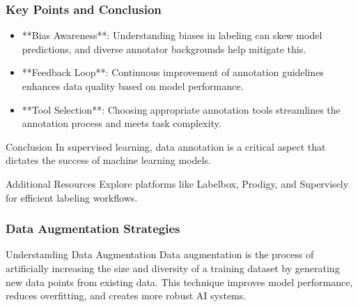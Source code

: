\documentclass[aspectratio=169]{beamer}
\begin{document}
\begin{frame}[fragile]
    \frametitle{Key Points and Conclusion}
    \begin{itemize}
        \item **Bias Awareness**: Understanding biases in labeling can skew model predictions, and diverse annotator backgrounds help mitigate this.
        \item **Feedback Loop**: Continuous improvement of annotation guidelines enhances data quality based on model performance.
        \item **Tool Selection**: Choosing appropriate annotation tools streamlines the annotation process and meets task complexity.
    \end{itemize}
    \begin{block}{Conclusion}
        In supervised learning, data annotation is a critical aspect that dictates the success of machine learning models. 
    \end{block}
    \begin{block}{Additional Resources}
        Explore platforms like Labelbox, Prodigy, and Supervisely for efficient labeling workflows.
    \end{block}
\end{frame}

\begin{frame}[fragile]
    \frametitle{Data Augmentation Strategies}
    \begin{block}{Understanding Data Augmentation}
        Data augmentation is the process of artificially increasing the size and diversity of a training dataset by generating new data points from existing data. This technique improves model performance, reduces overfitting, and creates more robust AI systems.
    \end{block}
\end{frame}
\end{document}
